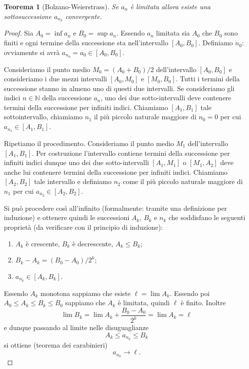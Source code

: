 \documentclass[italian,a4paper,oneside,headinclude]{scrbook}
\newcommand{\NN}{\mathbb N}
\newtheorem{theorem}{Teorema}
\begin{document}
\begin{theorem}[Bolzano-Weierstrass]
Se $a_n$ è limitata allora esiste una sottosuccessione
$a_{n_k}$ convergente.
\end{theorem}
%
\begin{proof}
Sia $A_0=\inf a_n$ e $B_0=\sup a_n$. Essendo $a_n$ limitata sia $A_0$
che $B_0$ sono finiti e ogni termine della successione sta
nell'intervallo $[A_0,B_0]$. Definiamo $n_0$: ovviamente si avrà $a_{n_0} = a_0 \in [A_0, B_0]$.

Consideriamo il punto medio $M_0 = (A_0+B_0)/2$ dell'intervallo $[A_0,B_0]$ e consideriamo i due mezzi intervalli $[A_0,M_0]$ e $[M_0,B_0]$. Tutti i termini della successione stanno in almeno
uno di questi due intervalli.
Se consideriamo gli indici $n\in \NN$ della successione $a_n$, uno dei due sotto-intervalli deve contenere termini
della successione per infiniti indici.
Chiamiamo $[A_1, B_1]$
tale sottointervallo,
chiamiamo $n_1$ il più piccolo naturale maggiore di $n_0=0$
per cui $a_{n_1} \in [A_1,  B_1]$.

Ripetiamo il procedimento.
Consideriamo il punto medio $M_1$ dell'intervallo $[A_1,B_1]$.
Per costruzione l'intervallo contiene termini della successione
per infiniti indici dunque uno dei due sotto-intervalli $[A_1,M_1]$
o $[M_1,A_2]$ deve anche lui
contenere termini della successione per infiniti indici. Chiamiamo
$[A_2, B_2]$ tale intervallo e definiamo $n_2$ come il più piccolo
naturale maggiore di $n_1$ per cui $a_{n_2}\in [A_2, B_2]$.

Si può procedere così all'infinito (formalmente: tramite una definizione per induzione)
e ottenere quindi le successioni $A_k$, $B_k$ e $n_k$ che soddisfano le seguenti proprietà (da verificare con il principio di induzione):
\begin{enumerate}
\item $A_k$ è crescente, $B_k$ è decrescente, $A_k \le B_k$;
\item $B_k - A_k = (B_0-A_0)/2^k$;
\item $a_{n_k} \in [A_k, B_k]$.
\end{enumerate}

Essendo $A_k$ monotona sappiamo che esiste $\ell = \lim A_k$. Essendo poi $A_0 \le A_k \le B_k \le B_0$ sappiamo che $A_k$ è limitata, quindi $\ell$ è finito.
Inoltre
\[
 \lim B_k = \lim A_k + \frac{B_0-A_0}{2^k} = \lim A_k = \ell
 \]
 e dunque
passando al limite nelle disuguaglianze
\[
   A_k \le a_{n_k} \le B_k
\]
si ottiene (teorema dei carabinieri)
\[
  a_{n_k} \to \ell.
\]
\end{proof}
\end{document}
